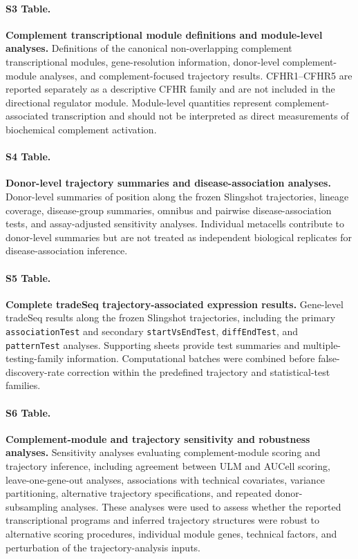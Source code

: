 \documentclass[10pt,letterpaper]{article}
\begin{document}
\paragraph*{S3 Table.}
\label{S3_Table}
\textbf{Complement transcriptional module definitions and module-level analyses.}
Definitions of the canonical non-overlapping complement transcriptional modules, gene-resolution information, donor-level complement-module analyses, and complement-focused trajectory results. CFHR1--CFHR5 are reported separately as a descriptive CFHR family and are not included in the directional regulator module. Module-level quantities represent complement-associated transcription and should not be interpreted as direct measurements of biochemical complement activation.

\paragraph*{S4 Table.}
\label{S4_Table}
\textbf{Donor-level trajectory summaries and disease-association analyses.}
Donor-level summaries of position along the frozen Slingshot trajectories, lineage coverage, disease-group summaries, omnibus and pairwise disease-association tests, and assay-adjusted sensitivity analyses. Individual metacells contribute to donor-level summaries but are not treated as independent biological replicates for disease-association inference.

\paragraph*{S5 Table.}
\label{S5_Table}
\textbf{Complete tradeSeq trajectory-associated expression results.}
Gene-level tradeSeq results along the frozen Slingshot trajectories, including the primary \texttt{associationTest} and secondary \texttt{startVsEndTest}, \texttt{diffEndTest}, and \texttt{patternTest} analyses. Supporting sheets provide test summaries and multiple-testing-family information. Computational batches were combined before false-discovery-rate correction within the predefined trajectory and statistical-test families.

\paragraph*{S6 Table.}
\label{S6_Table}
\textbf{Complement-module and trajectory sensitivity and robustness analyses.}
Sensitivity analyses evaluating complement-module scoring and trajectory inference, including agreement between ULM and AUCell scoring, leave-one-gene-out analyses, associations with technical covariates, variance partitioning, alternative trajectory specifications, and repeated donor-subsampling analyses. These analyses were used to assess whether the reported transcriptional programs and inferred trajectory structures were robust to alternative scoring procedures, individual module genes, technical factors, and perturbation of the trajectory-analysis inputs.
\end{document}
